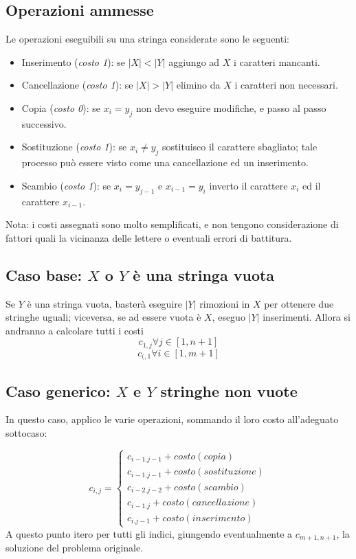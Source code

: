 \documentclass{article}
\begin{document}
\subsection{Operazioni ammesse}
Le operazioni eseguibili su una stringa considerate sono le seguenti:
\begin{itemize}
	\item Inserimento (\emph{costo 1}): se $|X| < |Y|$ aggiungo ad $X$ i caratteri mancanti.
	\item Cancellazione (\emph{costo 1}): se $|X| > |Y|$ elimino da $X$ i caratteri non necessari.
	\item Copia (\emph{costo 0}): se $x_i = y_j$ non devo eseguire modifiche, e passo al passo successivo.
	\item Sostituzione (\emph{costo 1}): se $x_i \ne y_j$ sostituisco il carattere sbagliato; tale processo può essere visto come una cancellazione ed un inserimento.
	\item Scambio (\emph{costo 1}): se $x_i = y_{j-1}$ e $x_{i-1} = y_i$ inverto il carattere $x_i$ ed il carattere $x_{i-1}$.
\end{itemize}
Nota: i costi assegnati sono molto semplificati, e non tengono considerazione di fattori quali la vicinanza delle lettere o eventuali errori di battitura.

\subsection{Caso base: $X$ o $Y$ è una stringa vuota}
Se $Y$ è una stringa vuota, basterà eseguire $|Y|$ rimozioni in $X$ per ottenere due stringhe uguali; viceversa, se ad essere vuota è $X$, eseguo $|Y|$ inserimenti. Allora si andranno a calcolare tutti i costi $$c_{1, j} \forall j \in [1, n+1]$$$$  c_{(, 1} \forall i \in [1, m+1]$$

\subsection{Caso generico: $X$ e $Y$ stringhe non vuote}
In questo caso, applico le varie operazioni, sommando il loro costo all'adeguato sottocaso:


$$
c_{i, j}=\begin{cases} c_{i-1. j-1} + costo(copia) \\ c_{i-1. j-1} + costo(sostituzione) \\  c_{i-2. j-2} + costo(scambio) \\ c_{i-1. j} + costo(cancellazione) \\ c_{i. j-1} + costo(inserimento) \end{cases}
$$
 A questo punto itero per tutti gli indici, giungendo eventualmente a $c_{m+1, n+1}$, la soluzione del problema originale.
 
\end{document}
